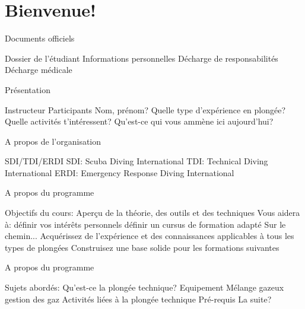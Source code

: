 
\section{Bienvenue!}

\begin{frame}{Documents officiels}
	\begin{outline}
		\1 Dossier de l'étudiant
			\2 Informations personnelles
			\2 Décharge de responsabilités
			\2 Décharge médicale
	\end{outline}
\end{frame}
\begin{frame}{Présentation}
	\begin{outline}
		\1 Instructeur
		\1Participants
			\2 Nom, prénom?
			\2 Quelle type d'expérience en plongée?
			\2 Quelle activités t'intéressent?
			\2 Qu'est-ce qui vous ammène ici aujourd'hui?
	\end{outline}
\end{frame}
\begin{frame}{A propos de l'organisation}  
	\begin{outline}
		\1	SDI/TDI/ERDI
			\2 SDI: Scuba Diving International
			\2 TDI: Technical Diving International
			\2 ERDI: Emergency Response Diving International
	\end{outline}
\end{frame}
\begin{frame}{A propos du programme}
	\begin{outline}
		\1 Objectifs du cours:
			\2 Aperçu de la théorie, des outils et des techniques
			\2 Vous aidera à:
			\3 définir vos intérêts personnels
			\3 définir un cursus de formation adapté
			\2 Sur le chemin...
			\3 Acquérissez de l'expérience et des connaissances applicables à tous les types de plongées
			\3 Construisez une base solide pour les formations suivantes
	\end{outline}    
\end{frame}
\begin{frame}{A propos du programme}
	\begin{outline}
		\1 Sujets abordés:
			\2 Qu'est-ce la plongée technique?
			\2 Equipement
			\2 Mélange gazeux gestion des gaz
			\2 Activités liées à la plongée technique
			\2 Pré-requis
			\2 La suite?
	\end{outline}    
\end{frame}
